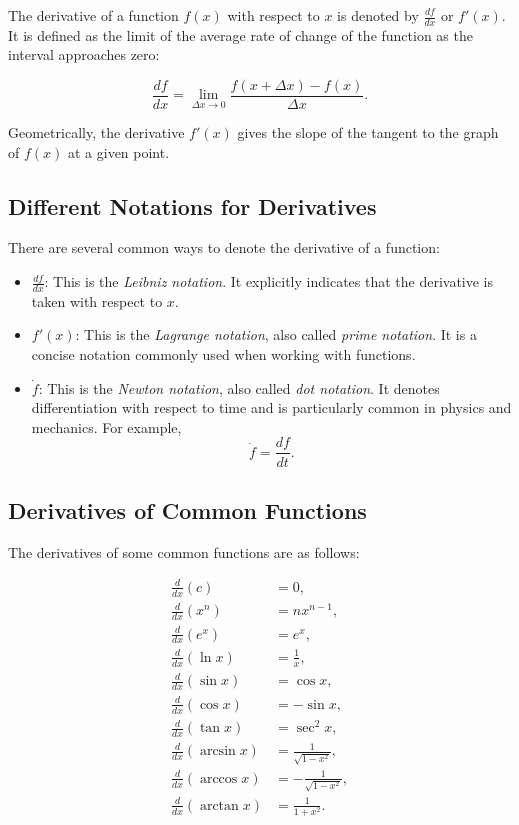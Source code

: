 \documentclass[../main.tex]{subfiles}
\begin{document}
The derivative of a function \(f(x)\) with respect to \(x\) is denoted by
\(\frac{df}{dx}\) or \(f'(x)\). It is defined as the limit of the average rate of change of the function as the interval approaches zero:

\[
\frac{df}{dx}
=
\lim_{\Delta x \to 0}
\frac{f(x+\Delta x)-f(x)}{\Delta x}.
\]

Geometrically, the derivative \(f'(x)\) gives the slope of the tangent to the graph of \(f(x)\) at a given point.

\subsection{Different Notations for Derivatives}

There are several common ways to denote the derivative of a function:

\begin{itemize}

\item $\frac{df}{dx}$: This is the \emph{Leibniz notation}. It explicitly indicates that the derivative is taken with respect to \(x\).

\item $f'(x)$: This is the \emph{Lagrange notation}, also called \emph{prime notation}. It is a concise notation commonly used when working with functions.

\item $\dot{f}$: This is the \emph{Newton notation}, also called \emph{dot notation}. It denotes differentiation with respect to time and is particularly common in physics and mechanics. For example,
	\[\dot{f} = \frac{df}{dt}.\]
\end{itemize}

\subsection{Derivatives of Common Functions}

The derivatives of some common functions are as follows:

\begin{align*}
	\frac{d}{dx}(c) &= 0, \\
	\frac{d}{dx}(x^n) &= nx^{n-1}, \\
	\frac{d}{dx}(e^x) &= e^x, \\
	\frac{d}{dx}(\ln x) &= \frac{1}{x}, \\
	\frac{d}{dx}(\sin x) &= \cos x, \\
	\frac{d}{dx}(\cos x) &= -\sin x, \\
	\frac{d}{dx}(\tan x) &= \sec^2 x, \\
	\frac{d}{dx}(\arcsin x) &= \frac{1}{\sqrt{1-x^2}}, \\
	\frac{d}{dx}(\arccos x) &= -\frac{1}{\sqrt{1-x^2}}, \\
	\frac{d}{dx}(\arctan x) &= \frac{1}{1+x^2}.
\end{align*}
\end{document}
